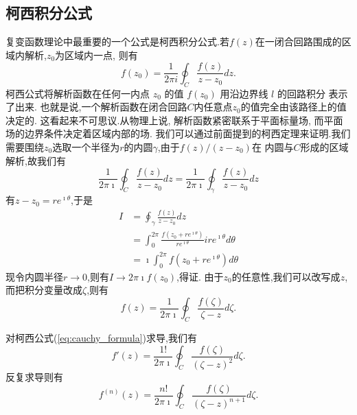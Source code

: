\subsection{柯西积分公式}
\label{subsec:cauchy_formula}
复变函数理论中最重要的一个公式是柯西积分公式.若$f(z)$在一闭合回路围成的区域内解析,$z_0$为区域内一点,
则有
\begin{equation}
    f\left(z_0\right)=\frac{1}{2 \pi i} \oint_C \frac{f(z)}{z-z_0} d z .  
\end{equation}
柯西公式将解析函数在任何一内点 $z_0$ 的值 $f(z_0)$ 用沿边界线 $l$ 的回路积分 表示了出来.
也就是说,一个解析函数在闭合回路$C$内任意点$z_0$的值完全由该路径上的值决定的. 
这看起来不可思议.从物理上说, 解析函数紧密联系于平面标量场, 而平面场的边界条件决定着区域内部的场.
我们可以通过前面提到的柯西定理来证明.我们需要围绕$z_0$选取一个半径为$r$的内圆$\gamma$,由于$f(z)/(z-z_0)$在
内圆与$C$形成的区域解析,故我们有
\[ \frac{1}{2 \pi \imath} \oint_C \frac{f(z)}{z-z_0} d z = \frac{1}{2 \pi \imath} \oint_\gamma \frac{f(z)}{z-z_0} d z
    \]
有$z-z_0 = re^{\imath \theta}$,于是
\begin{equation}
    \begin{aligned}
        I &= \oint_\gamma \frac{f(z)}{z-z_0} d z
        \\
        & = \int _0 ^{2\pi} \frac{f(z_0 + re^{\imath \theta})}{re^{\imath \theta}} ire^{\imath \theta} d\theta
        \\
        & = \imath \int _0 ^{2\pi} f(z_0 + re^{\imath \theta}) d\theta
    \end{aligned}
\end{equation}
现令内圆半径$r\to 0$,则有$I\to 2\pi\imath f(z_0)$,得证.
由于$z_0$的任意性,我们可以改写成$z$,而把积分变量改成$\zeta$,则有
\begin{equation}
    f(z) = \frac{1}{2\pi \imath} \oint_C \frac{f(\zeta)}{\zeta - z} d \zeta.
    \label{eq:cauchy_formula}
\end{equation}

对柯西公式(\ref{eq:cauchy_formula})求导,我们有
\begin{equation}
    f'(z) = \frac{1!}{2\pi \imath} \oint_C \frac{f(\zeta)}{(\zeta - z)^2} d \zeta.
    \label{eq:cauchy_formula_1st_derivative}
\end{equation}
反复求导则有
\begin{equation}
    f^{(n)}(z) = \frac{n!}{2\pi \imath} \oint_C \frac{f(\zeta)}{(\zeta - z)^{n+1}} d \zeta.
    \label{eq:cauchy_formula_nth_derivative}
\end{equation}


